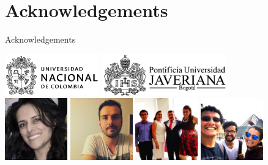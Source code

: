 \documentclass[11pt]{beamer}
\begin{document}
\section{Acknowledgements}
\begin{frame}{Acknowledgements}
\begin{center}
\includegraphics[height=1.8cm]{UN}\hspace{0.5cm}
\includegraphics[height=1.8cm]{Javeriana}\vspace{0.5cm}\\
\includegraphics[width=2.7cm]{Janneth}
\includegraphics[width=2.7cm]{Andres}
\includegraphics[width=2.7cm]{Familia}
\includegraphics[width=2.7cm]{Kelly-Juan-Daniel}
\end{center}
\end{frame}
\end{document}
